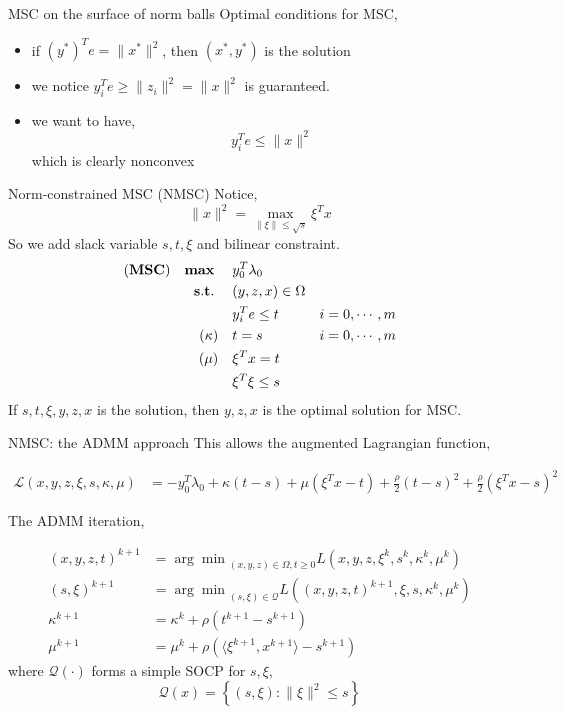 \begin{frame}{MSC on the surface of norm balls}
  Optimal conditions for MSC,
  \begin{itemize}
    \item if \((y^*)^Te = \|x^*\|^2\), then \((x^*, y^*)\) is the solution
    \item we notice \(y_i^Te \ge \|z_i\|^2 = \|x\|^2 \) is guaranteed.
    \item we want to have,
          \[y_i^Te \le \|x\|^2\]
          which is clearly nonconvex
  \end{itemize}
\end{frame}
\begin{frame}{Norm-constrained MSC (NMSC)}
  Notice,
  \begin{equation}
    \|x\|^2 = \max_{\|\xi\| \le \sqrt s} \xi^T x
  \end{equation}
  So we add slack variable \(s, t, \xi\) and bilinear constraint.
  \begin{align}
    (\textbf{MSC}) \quad \mathbf{max}\;\quad & y_0 ^T\lambda_0                     \\
    \mathbf{s.t.}\; \quad                  & (y,z,x) \in \Omega                  \\
                               & y_i^Te \le t       & i=0, \cdots, m \\
    (\kappa) \quad             & t= s               & i=0, \cdots, m \\
    (\mu)    \quad             & \xi^Tx = t                          \\
                               & \xi^T\xi \le s
  \end{align}
  If \(s, t, \xi, y, z, x\) is the solution, then \( y, z, x\) is the optimal solution for MSC.
\end{frame}
\begin{frame}{NMSC: the ADMM approach}
  This allows the augmented Lagrangian function,

  \begin{align*}
    \mathscr L\left(x,y,z,\xi,s,\kappa,\mu\right) & = - y_0 ^T\lambda_0 + \kappa(t-s) + \mu(\xi^Tx - t) + \frac{\rho}{2}(t-s)^2 + \frac{\rho}{2}(\xi^Tx - s)^2
  \end{align*}

  The ADMM iteration,

  \begin{align*}
    (x,y,z,t)^{k+1} & = {\arg\min}_{(x,y,z)\in\Omega, t\ge 0} L\left(x,y,z,\xi^k,s^k,\kappa^k,\mu^k\right)       \\
    (s, \xi)^{k+1}  & = {\arg\min}_{(s, \xi)\in\mathscr{Q}} L\left((x,y,z,t)^{k+1},\xi,s, \kappa^k, \mu^k\right) \\
    \kappa^{k+1}    & = \kappa^k + \rho\left(t^{k+1}-s^{k+1}\right)                                              \\
    \mu^{k+1}       & = \mu^k + \rho\left( \langle\xi^{k+1}, x^{k+1}\rangle - s^{k+1}\right)
  \end{align*}
  where \(\mathscr{Q(\cdot)}\) forms a simple SOCP for \(s, \xi\),
  \begin{equation}
    \mathscr{Q}(x) =\left\{(s,\xi): \|\xi\|^2 \le s\right\}
  \end{equation}
\end{frame}
